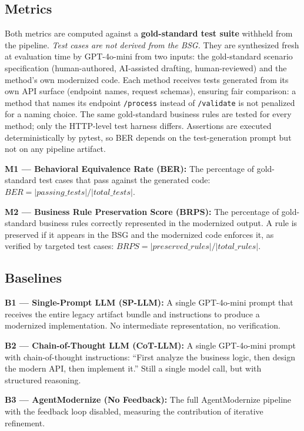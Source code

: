 \documentclass[conference]{IEEEtran}
\begin{document}
\subsection{Metrics}

Both metrics are computed against a \textbf{gold-standard test suite} withheld from the pipeline. \emph{Test cases are not derived from the BSG.} They are synthesized fresh at evaluation time by GPT-4o-mini from two inputs: the gold-standard scenario specification (human-authored, AI-assisted drafting, human-reviewed) and the method's own modernized code. Each method receives tests generated from its own API surface (endpoint names, request schemas), ensuring fair comparison: a method that names its endpoint \texttt{/process} instead of \texttt{/validate} is not penalized for a naming choice. The same gold-standard business rules are tested for every method; only the HTTP-level test harness differs. Assertions are executed deterministically by pytest, so BER depends on the test-generation prompt but not on any pipeline artifact.

\textbf{M1 --- Behavioral Equivalence Rate (BER):} The percentage of gold-standard test cases that pass against the generated code: $BER = |passing\_tests| / |total\_tests|$.

\textbf{M2 --- Business Rule Preservation Score (BRPS):} The percentage of gold-standard business rules correctly represented in the modernized output. A rule is preserved if it appears in the BSG and the modernized code enforces it, as verified by targeted test cases: $BRPS = |preserved\_rules| / |total\_rules|$.

\subsection{Baselines}

\textbf{B1 --- Single-Prompt LLM (SP-LLM):} A single GPT-4o-mini prompt that receives the entire legacy artifact bundle and instructions to produce a modernized implementation. No intermediate representation, no verification.

\textbf{B2 --- Chain-of-Thought LLM (CoT-LLM):} A single GPT-4o-mini prompt with chain-of-thought instructions: ``First analyze the business logic, then design the modern API, then implement it.'' Still a single model call, but with structured reasoning.

\textbf{B3 --- AgentModernize (No Feedback):} The full AgentModernize pipeline with the feedback loop disabled, measuring the contribution of iterative refinement.
\end{document}
